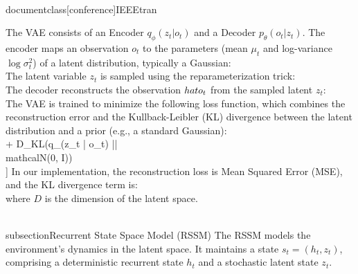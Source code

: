 \\documentclass[conference]{IEEEtran}
\begin{document}
The VAE consists of an Encoder \( q_{\phi}(z_t | o_t) \) and a Decoder \( p_{\theta}(o_t | z_t) \).
The encoder maps an observation \( o_t \) to the parameters (mean \( \mu_t \) and log-variance \( \log \sigma_t^2 \)) of a latent distribution, typically a Gaussian:
\\[ z_t \\sim \\mathcal{N}(\\mu_t, \\sigma_t^2) \\]
The latent variable \( z_t \) is sampled using the reparameterization trick:
\\[ z_t = \\mu_t + \\sigma_t \\odot \\epsilon, \\quad \\epsilon \\sim \\mathcal{N}(0, I) \\]
The decoder reconstructs the observation \( \\hat{o}_t \) from the sampled latent \( z_t \):
\\[ \\hat{o}_t = p_{\theta}(o_t | z_t) \\]
The VAE is trained to minimize the following loss function, which combines the reconstruction error and the Kullback-Leibler (KL) divergence between the latent distribution and a prior (e.g., a standard Gaussian):
\\[ \\mathcal{L}_{VAE} = -\\mathbb{E}_{q_{\phi}(z_t | o_t)}[\\log p_{\theta}(o_t | z_t)] + D_{KL}(q_{\phi}(z_t | o_t) || \\mathcal{N}(0, I)) \\]
In our implementation, the reconstruction loss is Mean Squared Error (MSE), and the KL divergence term is:
\\[ D_{KL} = -0.5 \\sum_{i=1}^{D} (1 + \\log \\sigm-i^2 - \\mu_i^2 - \\sigm-i^2) \\]
where \( D \) is the dimension of the latent space.

\\subsection{Recurrent State Space Model (RSSM)}
The RSSM models the environment's dynamics in the latent space. It maintains a state \( s_t = (h_t, z_t) \), comprising a deterministic recurrent state \( h_t \) and a stochastic latent state \( z_t \).
\end{document}
